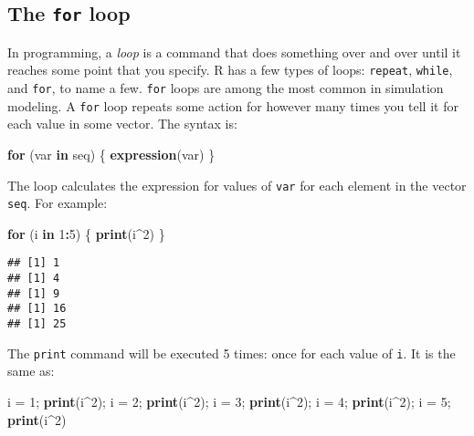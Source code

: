 \documentclass[]{book}
\newenvironment{Shaded}{\begin{snugshade}}{\end{snugshade}}
\newcommand{\KeywordTok}[1]{\textcolor[rgb]{0.13,0.29,0.53}{\textbf{#1}}}
\newcommand{\DecValTok}[1]{\textcolor[rgb]{0.00,0.00,0.81}{#1}}
\newcommand{\StringTok}[1]{\textcolor[rgb]{0.31,0.60,0.02}{#1}}
\newcommand{\ControlFlowTok}[1]{\textcolor[rgb]{0.13,0.29,0.53}{\textbf{#1}}}
\newcommand{\OperatorTok}[1]{\textcolor[rgb]{0.81,0.36,0.00}{\textbf{#1}}}
\newcommand{\NormalTok}[1]{#1}
\theoremstyle{definition}
\theoremstyle{definition}
\theoremstyle{definition}
\theoremstyle{remark}
\begin{document}
\subsection{\texorpdfstring{The \texttt{for}
loop}{The for loop}}\label{for-loops}

In programming, a \emph{loop} is a command that does something over and
over until it reaches some point that you specify. R has a few types of
loops: \texttt{repeat}, \texttt{while}, and \texttt{for}, to name a few.
\texttt{for} loops are among the most common in simulation modeling. A
\texttt{for} loop repeats some action for however many times you tell it
for each value in some vector. The syntax is:

\begin{Shaded}
\begin{Highlighting}[]
\ControlFlowTok{for}\NormalTok{ (var }\ControlFlowTok{in}\NormalTok{ seq) \{}
  \KeywordTok{expression}\NormalTok{(var)}
\NormalTok{\}}
\end{Highlighting}
\end{Shaded}

The loop calculates the expression for values of \texttt{var} for each
element in the vector \texttt{seq}. For example:

\begin{Shaded}
\begin{Highlighting}[]
\ControlFlowTok{for}\NormalTok{ (i }\ControlFlowTok{in} \DecValTok{1}\OperatorTok{:}\DecValTok{5}\NormalTok{) \{}
  \KeywordTok{print}\NormalTok{(i}\OperatorTok{^}\DecValTok{2}\NormalTok{)}
\NormalTok{\}}
\end{Highlighting}
\end{Shaded}

\begin{verbatim}
## [1] 1
## [1] 4
## [1] 9
## [1] 16
## [1] 25
\end{verbatim}

The \texttt{print} command will be executed 5 times: once for each value
of \texttt{i}. It is the same as:

\begin{Shaded}
\begin{Highlighting}[]
\NormalTok{i =}\StringTok{ }\DecValTok{1}\NormalTok{; }\KeywordTok{print}\NormalTok{(i}\OperatorTok{^}\DecValTok{2}\NormalTok{); i =}\StringTok{ }\DecValTok{2}\NormalTok{; }\KeywordTok{print}\NormalTok{(i}\OperatorTok{^}\DecValTok{2}\NormalTok{); i =}\StringTok{ }\DecValTok{3}\NormalTok{; }\KeywordTok{print}\NormalTok{(i}\OperatorTok{^}\DecValTok{2}\NormalTok{); i =}\StringTok{ }\DecValTok{4}\NormalTok{; }\KeywordTok{print}\NormalTok{(i}\OperatorTok{^}\DecValTok{2}\NormalTok{); i =}\StringTok{ }\DecValTok{5}\NormalTok{; }\KeywordTok{print}\NormalTok{(i}\OperatorTok{^}\DecValTok{2}\NormalTok{)}
\end{Highlighting}
\end{Shaded}
\end{document}
